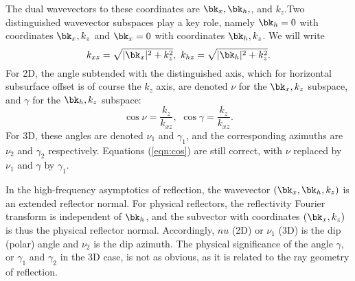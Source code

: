 The dual wavevectors to these coordinates are $\bk_x, \bk_h,$, and $k_z$.Two distinguished wavevector subspaces play a key role, namely $\bk_h=0$ with coordinates $\bk_x,k_z$ and $\bk_x=0$ with coordinates $\bk_h,k_z$. We will write 
\begin{equation}
\label{eqn:hyp}
k_{xz}=\sqrt{|\bk_x|^2 + k_z^2},\,\,k_{hz}=\sqrt{|\bk_h|^2+k_z^2}.
\end{equation} 
For 2D, the angle subtended with the distinguished axis, which for horizontal subsurface offset is of course the $k_z$ axis, are denoted $\nu $ for the $\bk_x,k_z$ subspace, and $\gamma $ for the $\bk_h,k_z$ subspace:
\begin{equation}
\label{eqn:cos}
\cos \nu = \frac{k_z}{k_{xz}},\,\, \cos \gamma = \frac{k_z}{k_{xz}}.
\end{equation}
For 3D, these angles are denoted $\nu_1$ and $\gamma_1$, and
the corresponding azimuths are $\nu_2 $ and $\gamma_2 $ respectively. Equations (\ref{eqn:cos}) are still correct, with $\nu$ replaced by $\nu_1$ and $\gamma$ by $\gamma_1$. 

In the high-frequency asymptotics of reflection, the wavevector $(\bk_x,\bk_h,k_z)$ is an extended reflector normal. For physical reflectors, the reflectivity Fourier transform is independent of $\bk_h$, and the subvector with coordinates $(\bk_x,k_z)$ is thus the physical reflector normal. Accordingly, $nu$ (2D) or $\nu_1$ (3D) is the dip (polar) angle and $\nu_2 $ is the dip azimuth. The physical significance of the angle $\gamma$, or $\gamma_1$ and $\gamma_2$ in the 3D case, is not as obvious, as it is related to the ray geometry of reflection.

